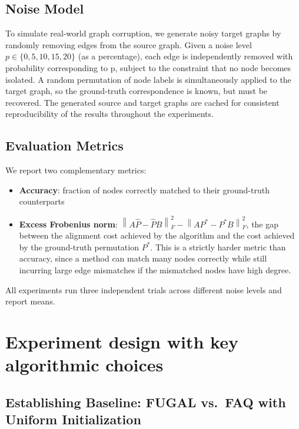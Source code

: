 \documentclass[11pt,a4paper]{article}
\newcommand{\frob}[1]{\left\lVert #1 \right\rVert_F}
\begin{document}
\subsection{Noise Model}

To simulate real-world graph corruption, we generate noisy target graphs by
randomly removing edges from the source graph.  Given a noise level
$p \in \{0, 5, 10, 15, 20\}$ (as a percentage), each edge is independently removed with probability corresponding to p, subject to the constraint that no node
becomes isolated.  A random permutation of node labels is simultaneously
applied to the target graph, so the ground-truth correspondence is known, but
must be recovered. The generated source and target graphs are cached for consistent reproducibility of the results throughout the experiments.

\subsection{Evaluation Metrics}

We report two complementary metrics:

\begin{itemize}
  \item \textbf{Accuracy}: fraction of nodes correctly matched to their
    ground-truth counterparts
  \item \textbf{Excess Frobenius norm}:
    $\frob{A\hat{P} - \hat{P}B}^2 - \frob{AP^* - P^*B}^2$,
    the gap between the alignment cost achieved by the algorithm and the cost
    achieved by the ground-truth permutation $P^*$.  This is a strictly
    harder metric than accuracy, since a method can match many nodes correctly
    while still incurring large edge mismatches if the mismatched nodes have
    high degree.
\end{itemize}

All experiments run three independent trials across different noise levels and report means.


\section{Experiment design with key algorithmic choices}


\subsection{Establishing Baseline: FUGAL vs.\ FAQ with Uniform Initialization}
\label{sec:baseline}
\end{document}
